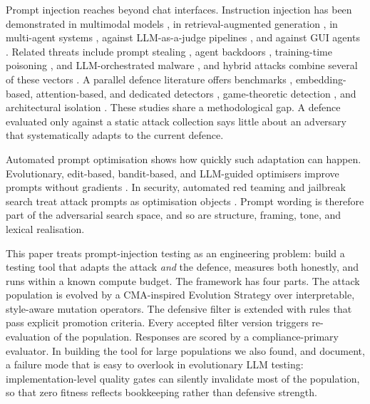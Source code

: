 \documentclass[preprint,12pt,authoryear]{elsarticle}
\begin{document}
Prompt injection reaches beyond chat interfaces. Instruction injection has been demonstrated in multimodal models \citep{bagdasaryan2023abusing}, in retrieval-augmented generation \citep{zou2025poisonedrag,clop2024backdoored}, in multi-agent systems \citep{lee2024infection}, against LLM-as-a-judge pipelines \citep{shi2024judge}, and against GUI agents \citep{lu2025eva}. Related threats include prompt stealing \citep{yang2025prsa}, agent backdoors \citep{zhu2025demonagent}, training-time poisoning \citep{gao2024dos}, and LLM-orchestrated malware \citep{raz2025ransomware}, and hybrid attacks combine several of these vectors \citep{mchugh2025pi2}. A parallel defence literature offers benchmarks \citep{liu2024formalizing}, embedding-based, attention-based, and dedicated detectors \citep{ayub2024embedding,hung2025attention,jacob2024promptshield,ivry2025sentinel,lin2025uniguardian}, game-theoretic detection \citep{liu2025datasentinel}, and architectural isolation \citep{debenedetti2025defeating}. These studies share a methodological gap. A defence evaluated only against a static attack collection says little about an adversary that systematically adapts to the current defence.

Automated prompt optimisation shows how quickly such adaptation can happen. Evolutionary, edit-based, bandit-based, and LLM-guided optimisers improve prompts without gradients \citep{zhou2023ape,prasad2023grips,chen2023instructzero,lin2023instinct,yang2024opro,guo2024evoprompt,fernando2023promptbreeder,wang2023promptagent,agarwal2024promptwizard,ye2024pe2,cheng2024bpo,sun2024colorful}. In security, automated red teaming and jailbreak search treat attack prompts as optimisation objects \citep{perez2022redteaming,liu2023autodan,shi2024judge,lu2025eva}. Prompt wording is therefore part of the adversarial search space, and so are structure, framing, tone, and lexical realisation.

This paper treats prompt-injection testing as an engineering problem: build a testing tool that adapts the attack \emph{and} the defence, measures both honestly, and runs within a known compute budget. The framework has four parts. The attack population is evolved by a CMA-inspired Evolution Strategy over interpretable, style-aware mutation operators. The defensive filter is extended with rules that pass explicit promotion criteria. Every accepted filter version triggers re-evaluation of the population. Responses are scored by a compliance-primary evaluator. In building the tool for large populations we also found, and document, a failure mode that is easy to overlook in evolutionary LLM testing: implementation-level quality gates can silently invalidate most of the population, so that zero fitness reflects bookkeeping rather than defensive strength.
\end{document}
